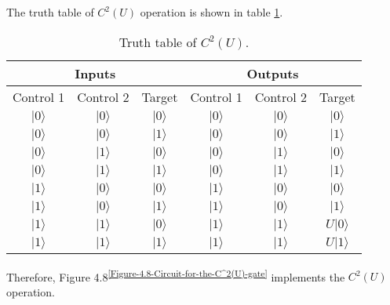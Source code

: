 \documentclass[en]{sol-man}
\begin{document}
\begin{pf}
    The truth table of $C^2(U)$ operation is shown in table \ref{E4.21-C2U-truth-table}.
    \begin{table}[h]
        \centering
        \caption{Truth table of $C^2(U)$.}
        \label{E4.21-C2U-truth-table}
        \begin{tabular}{|c|c|c|c|c|c|}
        \hline
        \multicolumn{3}{|c|}{Inputs} & \multicolumn{3}{c|}{Outputs} \\ \hline
        Control 1 & Control 2 & Target & Control 1 & Control 2 & Target \\ \hline
        $\lvert 0\rangle$ & $\lvert 0\rangle$ & $\lvert 0\rangle$ & $\lvert 0\rangle$ & $\lvert 0\rangle$ & $\lvert 0\rangle$ \\ \hline
        $\lvert 0\rangle$ & $\lvert 0\rangle$ & $\lvert 1\rangle$ & $\lvert 0\rangle$ & $\lvert 0\rangle$ & $\lvert 1\rangle$ \\ \hline
        $\lvert 0\rangle$ & $\lvert 1\rangle$ & $\lvert 0\rangle$ & $\lvert 0\rangle$ & $\lvert 1\rangle$ & $\lvert 0\rangle$ \\ \hline
        $\lvert 0\rangle$ & $\lvert 1\rangle$ & $\lvert 1\rangle$ & $\lvert 0\rangle$ & $\lvert 1\rangle$ & $\lvert 1\rangle$ \\ \hline
        $\lvert 1\rangle$ & $\lvert 0\rangle$ & $\lvert 0\rangle$ & $\lvert 1\rangle$ & $\lvert 0\rangle$ & $\lvert 0\rangle$ \\ \hline
        $\lvert 1\rangle$ & $\lvert 0\rangle$ & $\lvert 1\rangle$ & $\lvert 1\rangle$ & $\lvert 0\rangle$ & $\lvert 1\rangle$ \\ \hline
        $\lvert 1\rangle$ & $\lvert 1\rangle$ & $\lvert 0\rangle$ & $\lvert 1\rangle$ & $\lvert 1\rangle$ & $U\lvert 0\rangle$ \\ \hline
        $\lvert 1\rangle$ & $\lvert 1\rangle$ & $\lvert 1\rangle$ & $\lvert 1\rangle$ & $\lvert 1\rangle$ & $U\lvert 1\rangle$ \\ \hline
        \end{tabular}
    \end{table}

    Therefore, Figure 4.8\textsuperscript{\ref{Figure-4.8-Circuit-for-the-C^2(U)-gate}} implements the $C^2(U)$ operation.
\end{pf}
\end{document}
